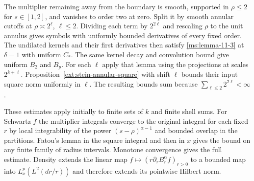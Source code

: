 The multiplier remaining away from the boundary is smooth, supported in $\rho\le2$ for $s\in[1,2]$, and vanishes to order two at zero. Split it by smooth annular cutoffs at $\rho\asymp2^\ell$, $\ell\le2$. Dividing each term by $2^{2\ell}$ and rescaling $\rho$ to the unit annulus gives symbols with uniformly bounded derivatives of every fixed order. The undilated kernels and their first derivatives then satisfy \ref{ms:lemma-11-3} at $\delta=1$ with uniform $C_*$. The same kernel decay and convolution bound give uniform $B_2$ and $B_p$. For each $\ell$ apply that lemma using the projections at scales $2^{k+\ell}$. Proposition~\ref{ext:stein-annular-square} with shift $\ell$ bounds their input square norm uniformly in $\ell$. The resulting bounds sum because $\sum_{\ell\le2}2^{2\ell}<\infty$.

These estimates apply initially to finite sets of $k$ and finite shell sums. For Schwartz $f$ the multiplier integrals converge to the original integral for each fixed $r$ by local integrability of the power $(s-\rho)^{\alpha-1}$ and bounded overlap in the partitions. Fatou's lemma in the square integral and then in $x$ gives the bound on any finite family of radius intervals. Monotone convergence gives the full estimate. Density extends the linear map $f\mapsto (r\partial_r B_r^\alpha f)_{r>0}$ to a bounded map into $L_x^p(L^2(dr/r))$ and therefore extends its pointwise Hilbert norm.
